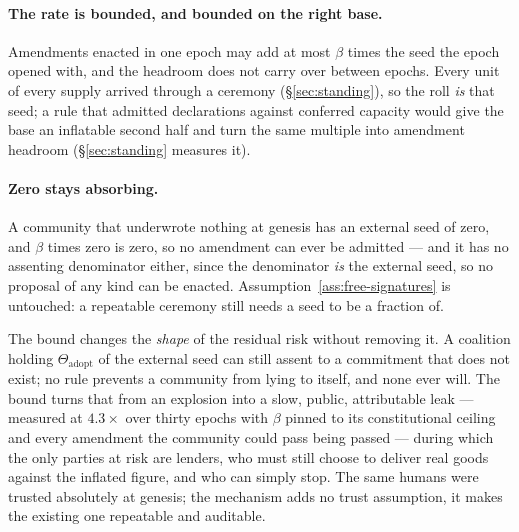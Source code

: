 \paragraph{The rate is bounded, and bounded on the right base.} Amendments enacted in one
epoch may add at most $\beta$ times the seed the epoch opened with, and the headroom does
not carry over between epochs. Every unit of every supply arrived through a ceremony
(\S\ref{sec:standing}), so the roll \emph{is} that seed; a rule that admitted
declarations against conferred capacity would give the base an inflatable second half and
turn the same multiple into amendment headroom (\S\ref{sec:standing} measures it).

\paragraph{Zero stays absorbing.} A community that underwrote nothing at genesis has an
external seed of zero, and $\beta$ times zero is zero, so no amendment can ever be
admitted --- and it has no assenting denominator either, since the denominator \emph{is}
the external seed, so no proposal of any kind can be enacted.
Assumption~\ref{ass:free-signatures} is untouched: a repeatable ceremony still needs a
seed to be a fraction of.

The bound changes the \emph{shape} of the residual risk without removing it. A coalition
holding $\Theta_{\mathrm{adopt}}$ of the external seed can still assent to a commitment
that does not exist; no rule prevents a community from lying to itself, and none ever
will. The bound turns that from an explosion into a slow, public, attributable leak ---
measured at $4.3\times$ over thirty epochs with $\beta$ pinned to its constitutional
ceiling and every amendment the community could pass being passed --- during which the
only parties at risk are lenders, who must still choose to deliver real goods against the
inflated figure, and who can simply stop. The same humans were trusted absolutely at
genesis; the mechanism adds no trust assumption, it makes the existing one repeatable and
auditable.

